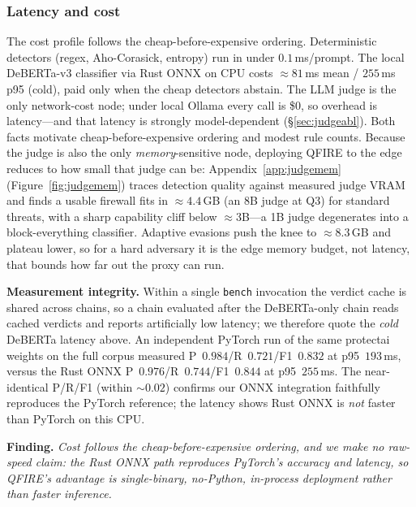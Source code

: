 \documentclass[11pt]{article}
\begin{document}
\subsubsection{Latency and cost}
The cost profile follows the cheap-before-expensive ordering. Deterministic
detectors (regex, Aho-Corasick, entropy) run in under $0.1$\,ms/prompt. The local
DeBERTa-v3 classifier via Rust ONNX on CPU costs ${\approx}81$\,ms mean /
$255$\,ms p95 (cold), paid only when the cheap detectors abstain. The LLM judge is
the only network-cost node; under local Ollama every call is \$0, so overhead is
latency---and that latency is strongly model-dependent (\S\ref{sec:judgeabl}). Both
facts motivate cheap-before-expensive ordering and modest rule counts.
Because the judge is also the only \emph{memory}-sensitive node, deploying QFIRE to
the edge reduces to how small that judge can be: Appendix~\ref{app:judgemem}
(Figure~\ref{fig:judgemem}) traces detection quality against measured judge VRAM and
finds a usable firewall fits in ${\approx}4.4$\,GB (an 8B judge at Q3) for standard
threats, with a sharp capability cliff below ${\approx}3$B---a 1B judge degenerates
into a block-everything classifier. Adaptive evasions push the knee to
${\approx}8.3$\,GB and plateau lower, so for a hard adversary it is the edge memory
budget, not latency, that bounds how far out the proxy can run.

\medskip\noindent\textbf{Measurement integrity.} Within a single \texttt{bench} invocation the verdict
cache is shared across chains, so a chain evaluated after the DeBERTa-only chain
reads cached verdicts and reports artificially low latency; we therefore quote the
\emph{cold} DeBERTa latency above. An independent PyTorch run of the same protectai
weights on the full corpus measured P~$0.984$/R~$0.721$/F1~$0.832$ at p95~$193$\,ms,
versus the Rust ONNX P~$0.976$/R~$0.744$/F1~$0.844$ at p95~$255$\,ms. The
near-identical P/R/F1 (within ${\sim}0.02$) confirms our ONNX integration faithfully
reproduces the PyTorch reference; the latency shows Rust ONNX is \emph{not} faster
than PyTorch on this CPU.

\medskip\noindent\textbf{Finding.} \emph{Cost follows the cheap-before-expensive ordering,
and we make no raw-speed claim: the Rust ONNX path reproduces PyTorch's accuracy and
latency, so QFIRE's advantage is single-binary, no-Python, in-process deployment
rather than faster inference.}
\end{document}

